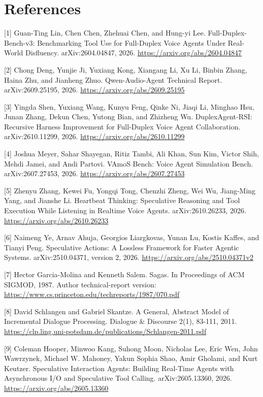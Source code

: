 \documentclass[11pt]{article}
\begin{document}
\section*{References}

[1] Guan-Ting Lin, Chen Chen, Zhehuai Chen, and Hung-yi Lee. Full-Duplex-Bench-v3: Benchmarking Tool Use for Full-Duplex Voice Agents Under Real-World Disfluency. arXiv:2604.04847, 2026. \url{https://arxiv.org/abs/2604.04847}


[2] Chong Deng, Yunjie Ji, Yuxiang Kong, Xiangang Li, Xu Li, Binbin Zhang, Haina Zhu, and Jianheng Zhuo. Qwen-Audio-Agent Technical Report. arXiv:2609.25195, 2026. \url{https://arxiv.org/abs/2609.25195}


[3] Yingda Shen, Yuxiang Wang, Kunyu Feng, Qinke Ni, Jiaqi Li, Minghao Hsu, Junan Zhang, Dekun Chen, Yutong Bian, and Zhizheng Wu. DuplexAgent-RSI: Recursive Harness Improvement for Full-Duplex Voice Agent Collaboration. arXiv:2610.11299, 2026. \url{https://arxiv.org/abs/2610.11299}


[4] Joshua Meyer, Sahar Shayegan, Ritiz Tambi, Ali Khan, Sun Kim, Victor Shih, Mehdi Jamei, and Andi Partovi. VAmoS Bench: Voice Agent Simulation Bench. arXiv:2607.27453, 2026. \url{https://arxiv.org/abs/2607.27453}


[5] Zhenyu Zhang, Kewei Fu, Yongqi Tong, Chenzhi Zheng, Wei Wu, Jiang-Ming Yang, and Jianshe Li. Heartbeat Thinking: Speculative Reasoning and Tool Execution While Listening in Realtime Voice Agents. arXiv:2610.26233, 2026. \url{https://arxiv.org/abs/2610.26233}


[6] Naimeng Ye, Arnav Ahuja, Georgios Liargkovas, Yunan Lu, Kostis Kaffes, and Tianyi Peng. Speculative Actions: A Lossless Framework for Faster Agentic Systems. arXiv:2510.04371, version 2, 2026. \url{https://arxiv.org/abs/2510.04371v2}


[7] Hector Garcia-Molina and Kenneth Salem. Sagas. In Proceedings of ACM SIGMOD, 1987. Author technical-report version: \url{https://www.cs.princeton.edu/techreports/1987/070.pdf}


[8] David Schlangen and Gabriel Skantze. A General, Abstract Model of Incremental Dialogue Processing. Dialogue \& Discourse 2(1), 83-111, 2011. \url{https://clp.ling.uni-potsdam.de/publications/Schlangen-2011.pdf}


[9] Coleman Hooper, Minwoo Kang, Suhong Moon, Nicholas Lee, Eric Wen, John Wawrzynek, Michael W. Mahoney, Yakun Sophia Shao, Amir Gholami, and Kurt Keutzer. Speculative Interaction Agents: Building Real-Time Agents with Asynchronous I/O and Speculative Tool Calling. arXiv:2605.13360, 2026. \url{https://arxiv.org/abs/2605.13360}
\end{document}
